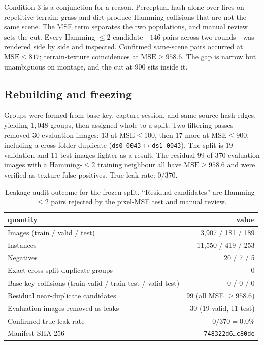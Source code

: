 Condition 3 is a conjunction for a reason. Perceptual hash alone over-fires on
repetitive terrain: grass and dirt produce Hamming collisions that are not the
same scene. The MSE term separates the two populations, and manual review sets
the cut. Every Hamming-$\le 2$ candidate---$146$ pairs across two rounds---was
rendered side by side and inspected. Confirmed same-scene pairs occurred at
$\mathrm{MSE} \le 817$; terrain-texture coincidences at
$\mathrm{MSE} \ge 958.6$. The gap is narrow but unambiguous on montage, and the
cut at $900$ sits inside it.

\subsection{Rebuilding and freezing}

Groups were formed from base key, capture session, and same-source hash edges,
yielding $1{,}048$ groups, then assigned whole to a split. Two filtering passes
removed $30$ evaluation images: $13$ at $\mathrm{MSE}\le 100$, then $17$ more at
$\mathrm{MSE}\le 900$, including a cross-folder duplicate
(\texttt{ds0\_0043}$\leftrightarrow$\texttt{ds1\_0043}). The split is
$19$ validation and $11$ test images lighter as a result. The residual $99$ of
$370$ evaluation images with a Hamming-$\le 2$ training neighbour all have
$\mathrm{MSE} \ge 958.6$ and were verified as texture false positives. True leak
rate: $0/370$.

\begin{table}[t]
\centering
\small
\caption{Leakage audit outcome for the frozen split. ``Residual candidates''
are Hamming-$\le2$ pairs rejected by the pixel-MSE test and manual review.}
\label{tab:audit}
\begin{tabular}{lr}
\toprule
quantity & value \\
\midrule
Images (train / valid / test) & 3{,}907 / 181 / 189 \\
Instances & 11{,}550 / 419 / 253 \\
Negatives & 20 / 7 / 5 \\
Exact cross-split duplicate groups & 0 \\
Base-key collisions (train-valid / train-test / valid-test) & 0 / 0 / 0 \\
Residual near-duplicate candidates & 99 (all MSE $\ge 958.6$) \\
Evaluation images removed as leaks & 30 (19 valid, 11 test) \\
Confirmed true leak rate & $0/370 = 0.0\%$ \\
Manifest SHA-256 & \texttt{748322d6\ldots c80de} \\
\bottomrule
\end{tabular}
\end{table}

